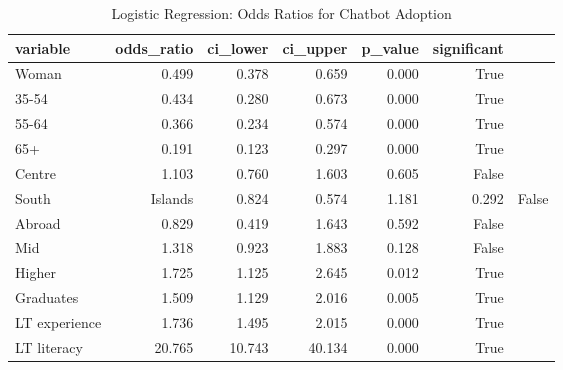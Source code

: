 \begin{table}
\caption{Logistic Regression: Odds Ratios for Chatbot Adoption}
\label{tab:odds_ratios}
\begin{tabular}{lrrrrr}
\toprule
variable & odds_ratio & ci_lower & ci_upper & p_value & significant \\
\midrule
Woman & 0.499 & 0.378 & 0.659 & 0.000 & True \\
35-54 & 0.434 & 0.280 & 0.673 & 0.000 & True \\
55-64 & 0.366 & 0.234 & 0.574 & 0.000 & True \\
65+ & 0.191 & 0.123 & 0.297 & 0.000 & True \\
Centre & 1.103 & 0.760 & 1.603 & 0.605 & False \\
South&Islands & 0.824 & 0.574 & 1.181 & 0.292 & False \\
Abroad & 0.829 & 0.419 & 1.643 & 0.592 & False \\
Mid & 1.318 & 0.923 & 1.883 & 0.128 & False \\
Higher & 1.725 & 1.125 & 2.645 & 0.012 & True \\
Graduates & 1.509 & 1.129 & 2.016 & 0.005 & True \\
LT experience & 1.736 & 1.495 & 2.015 & 0.000 & True \\
LT literacy & 20.765 & 10.743 & 40.134 & 0.000 & True \\
\bottomrule
\end{tabular}
\end{table}
